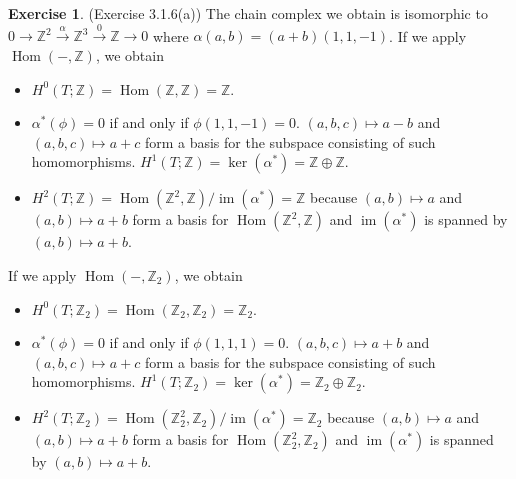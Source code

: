 \documentclass[12pt, psamsfonts]{amsart}
\theoremstyle{definition}
\newtheorem*{exer}{Exercise}
\theoremstyle{remark}
\DeclareMathOperator{\Hom}{Hom}
\DeclareMathOperator{\Hom}{Hom}
\DeclareMathOperator{\im}{im}
\numberwithin{equation}{section}
\begin{document}
\begin{exer}{(Exercise 3.1.6(a))}
  The chain complex we obtain is isomorphic to $0 \rightarrow \mathbb{Z}^2 \xrightarrow{\alpha} \mathbb{Z}^3 \xrightarrow{0} \mathbb{Z} \rightarrow 0$ where $\alpha(a, b) = (a + b)(1, 1, -1)$.
  If we apply $\Hom(-, \mathbb{Z})$, we obtain
  \begin{itemize}
    \item
      $H^0(T; \mathbb{Z}) = \Hom(\mathbb{Z}, \mathbb{Z}) = \mathbb{Z}$.
    \item
      $\alpha^{\ast}(\phi) = 0$ if and only if $\phi(1, 1, -1) = 0$.
      $(a, b, c) \mapsto a - b$ and $(a, b, c) \mapsto a + c$ form a basis for the subspace consisting of such homomorphisms.
      $H^1(T; \mathbb{Z}) = \ker(\alpha^{\ast}) = \mathbb{Z} \oplus \mathbb{Z}$.
    \item
      $H^2(T; \mathbb{Z}) = \Hom(\mathbb{Z}^2, \mathbb{Z}) / \im(\alpha^{\ast}) = \mathbb{Z}$ because $(a, b) \mapsto a$ and $(a, b) \mapsto a + b$ form a basis for $\Hom(\mathbb{Z}^2, \mathbb{Z})$ and $\im(\alpha^{\ast})$ is spanned by $(a, b) \mapsto a + b$.
  \end{itemize}
  If we apply $\Hom(-, \mathbb{Z}_2)$, we obtain
  \begin{itemize}
    \item
      $H^0(T; \mathbb{Z}_2) = \Hom(\mathbb{Z}_2, \mathbb{Z}_2) = \mathbb{Z}_2$.
    \item
      $\alpha^{\ast}(\phi) = 0$ if and only if $\phi(1, 1, 1) = 0$.
      $(a, b, c) \mapsto a + b$ and $(a, b, c) \mapsto a + c$ form a basis for the subspace consisting of such homomorphisms.
      $H^1(T; \mathbb{Z}_2) = \ker(\alpha^{\ast}) = \mathbb{Z}_2 \oplus \mathbb{Z}_2$.
    \item
      $H^2(T; \mathbb{Z}_2) = \Hom(\mathbb{Z}_2^2, \mathbb{Z}_2) / \im(\alpha^{\ast}) = \mathbb{Z}_2$ because $(a, b) \mapsto a$ and $(a, b) \mapsto a + b$ form a basis for $\Hom(\mathbb{Z}_2^2, \mathbb{Z}_2)$ and $\im(\alpha^{\ast})$ is spanned by $(a, b) \mapsto a + b$.
  \end{itemize}
\end{exer}
\end{document}
